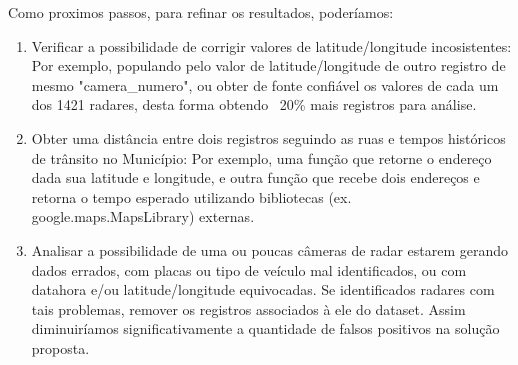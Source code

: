 \documentclass{article}
\begin{document}
Como proximos passos, para refinar os resultados, poderíamos:
\begin{enumerate}
\item Verificar a possibilidade de corrigir valores de latitude/longitude incosistentes: Por exemplo, populando pelo valor de latitude/longitude de outro registro de mesmo "camera\_numero", ou obter de fonte confiável os valores de cada um dos 1421 radares, desta forma obtendo ~20\% mais registros para análise.
\item Obter uma distância entre dois registros seguindo as ruas e tempos históricos de trânsito no Município: Por exemplo, uma função que retorne o endereço dada sua latitude e longitude, e outra função que recebe dois endereços e retorna o tempo esperado utilizando bibliotecas (ex. google.maps.MapsLibrary) externas.
\item Analisar a possibilidade de uma ou poucas câmeras de radar estarem gerando dados errados, com placas ou tipo de veículo mal identificados, ou com datahora e/ou latitude/longitude equivocadas. Se identificados radares com tais problemas, remover os registros associados à ele do dataset. Assim diminuiríamos significativamente a quantidade de falsos positivos na solução proposta.
\end{enumerate}
\end{document}
